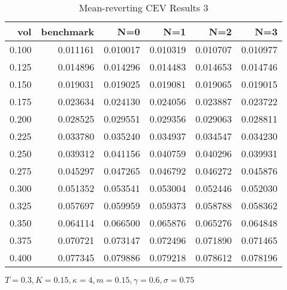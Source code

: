 \begin{table}[ht]
  \centering
  \caption{Mean-reverting CEV Results 3}
  \begin{tabular}{rrrrrr}
  \toprule
    vol &       benchmark &       N=0 &       N=1 &       N=2 &       N=3 \\
  \midrule
  0.100 & 0.011161 & 0.010017 & 0.010319 & 0.010707 & 0.010977 \\
  0.125 & 0.014896 & 0.014296 & 0.014483 & 0.014653 & 0.014746 \\
  0.150 & 0.019031 & 0.019025 & 0.019081 & 0.019065 & 0.019015 \\
  0.175 & 0.023634 & 0.024130 & 0.024056 & 0.023887 & 0.023722 \\
  0.200 & 0.028525 & 0.029551 & 0.029356 & 0.029063 & 0.028811 \\
  0.225 & 0.033780 & 0.035240 & 0.034937 & 0.034547 & 0.034230 \\
  0.250 & 0.039312 & 0.041156 & 0.040759 & 0.040296 & 0.039931 \\
  0.275 & 0.045297 & 0.047265 & 0.046792 & 0.046272 & 0.045876 \\
  0.300 & 0.051352 & 0.053541 & 0.053004 & 0.052446 & 0.052030 \\
  0.325 & 0.057697 & 0.059959 & 0.059373 & 0.058788 & 0.058362 \\
  0.350 & 0.064114 & 0.066500 & 0.065876 & 0.065276 & 0.064848 \\
  0.375 & 0.070721 & 0.073147 & 0.072496 & 0.071890 & 0.071465 \\
  0.400 & 0.077345 & 0.079886 & 0.079218 & 0.078612 & 0.078196 \\
  \bottomrule
  \end{tabular}
  \small{$T=0.3,K=0.15, \kappa = 4,m=0.15, \gamma = 0.6, \sigma = 0.75$}
\end{table}     

